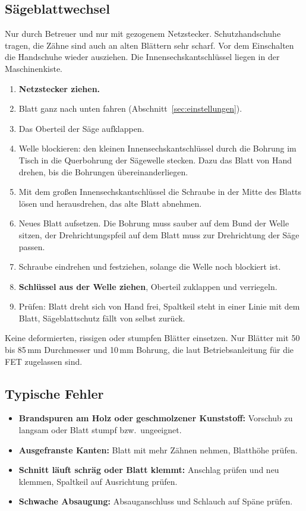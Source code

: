 \documentclass{\basedir/fablab-document}
\begin{document}
	\subsection{Sägeblattwechsel}
	\label{sec:blattwechsel}
	Nur durch Betreuer und nur mit gezogenem Netzstecker. Schutzhandschuhe tragen, die Zähne sind auch an alten Blättern sehr scharf. Vor dem Einschalten die Handschuhe wieder ausziehen. Die Innensechskantschlüssel liegen in der Maschinenkiste.
	\begin{enumerate}
		\item \textbf{Netzstecker ziehen.}
		\item Blatt ganz nach unten fahren (Abschnitt~\ref{sec:einstellungen}).
		\item Das Oberteil der Säge aufklappen.
		\item Welle blockieren: den kleinen Innensechskantschlüssel durch die Bohrung im Tisch in die Querbohrung der Sägewelle stecken. Dazu das Blatt von Hand drehen, bis die Bohrungen übereinanderliegen.
		\item Mit dem großen Innensechskantschlüssel die Schraube in der Mitte des Blatts lösen und herausdrehen, das alte Blatt abnehmen.
		\item Neues Blatt aufsetzen. Die Bohrung muss sauber auf dem Bund der Welle sitzen, der Drehrichtungspfeil auf dem Blatt muss zur Drehrichtung der Säge passen.
		\item Schraube eindrehen und festziehen, solange die Welle noch blockiert ist.
		\item \textbf{Schlüssel aus der Welle ziehen}, Oberteil zuklappen und verriegeln.
		\item Prüfen: Blatt dreht sich von Hand frei, Spaltkeil steht in einer Linie mit dem Blatt, Sägeblattschutz fällt von selbst zurück.
	\end{enumerate}
	Keine deformierten, rissigen oder stumpfen Blätter einsetzen. Nur Blätter mit 50 bis 85\,mm Durchmesser und 10\,mm Bohrung, die laut Betriebsanleitung für die FET zugelassen sind.

	\subsection{Typische Fehler}
	\begin{itemize}
		\item \textbf{Brandspuren am Holz oder geschmolzener Kunststoff:} Vorschub zu langsam oder Blatt stumpf bzw.\ ungeeignet.
		\item \textbf{Ausgefranste Kanten:} Blatt mit mehr Zähnen nehmen, Blatthöhe prüfen.
		\item \textbf{Schnitt läuft schräg oder Blatt klemmt:} Anschlag prüfen und neu klemmen, Spaltkeil auf Ausrichtung prüfen.
		\item \textbf{Schwache Absaugung:} Absauganschluss und Schlauch auf Späne prüfen.
	\end{itemize}
\end{document}
